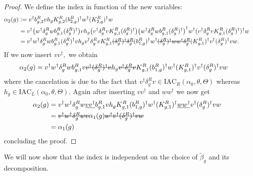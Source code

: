 \documentclass[11pt,a4paper,twoside]{article}
\numberwithin{equation}{section}
\begin{document}
\begin{proof}
	We define the index in function of the new variables:
	\begin{align}
		\alpha_2(g)&\defeq v^\dagger b^R_{g,2}v h_g K^R_{g,2}(b^R_{2,g})^\dagger w^\dagger (K^R_{2,g})^\dagger w\\
		&=v^\dagger \left(w^\dagger\delta^R_g w b_{g,1}^R (\delta^R_g)^\dagger\right) v h_g \left(v^\dagger \delta_g^R v K_{g,1}^R (\delta_g^R)^\dagger\right) \left(w^\dagger\delta^R_g w b_{g,1}^R (\delta^R_g)^\dagger\right)^\dagger w^\dagger (v^\dagger \delta_g^R v K_{g,1}^R (\delta_g^R)^\dagger)^\dagger w\\
		&=v^\dagger w^\dagger\delta^R_g w b_{g,1}^R (\delta^R_g)^\dagger v h_g v^\dagger \delta_g^R v K_{g,1}^R \stkout{(\delta_g^R)^\dagger \delta_g^R} (b_{1,g}^R)^\dagger w^\dagger \stkout{(\delta_g^R)^\dagger w w^\dagger \delta_g^R} (K_{g,1}^R)^\dagger v^\dagger (\delta_g^R)^\dagger v  w.
	\end{align}
	If we now insert $vv^\dagger,$ we obtain
	\begin{align}
		\alpha_2(g)&=v^\dagger w^\dagger\delta^R_g w b_{g,1}^R v\stkout{v^\dagger (\delta^R_g)^\dagger v} h_g \stkout{v^\dagger \delta_g^R v} K_{g,1}^R (b_{1,g}^R)^\dagger w^\dagger (K_{g,1}^R)^\dagger v^\dagger (\delta_g^R)^\dagger v  w
	\end{align}
	where the cancelation is due to the fact that $v^\dagger \delta^R_g v\in\textrm{IAC}_{R}(\alpha_0,\theta,\Theta)$ whereas $h_g\in \textrm{IAC}_{L}(\alpha_0,\theta,\Theta)$. Again after inserting $vv^\dagger$ and $ww^\dagger$ we now get
	\begin{align}
		\alpha_2(g)&=v^\dagger w^\dagger\delta^R_g w \underline{v v^\dagger} b_{g,1}^R v h_g K_{g,1}^R (b_{1,g}^R)^\dagger w^\dagger (K_{g,1}^R)^\dagger \underline{ww^\dagger} v^\dagger (\delta_g^R)^\dagger v  w\\
		&=\stkout{v^\dagger w^\dagger\delta^R_g w v} \alpha_1(g) \stkout{w^\dagger v^\dagger (\delta_g^R)^\dagger v  w}\\
		&=\alpha_1(g)
	\end{align}
	concluding the proof.
\end{proof}
We will now show that the index is independent on the choice of $\tilde{\beta}_g$ and its decomposition.
\end{document}
